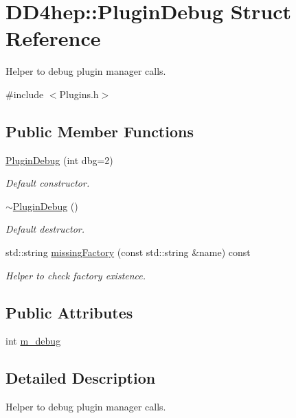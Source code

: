 \hypertarget{struct_d_d4hep_1_1_plugin_debug}{}\section{D\+D4hep\+:\+:Plugin\+Debug Struct Reference}
\label{struct_d_d4hep_1_1_plugin_debug}


Helper to debug plugin manager calls.  




{\ttfamily \#include $<$Plugins.\+h$>$}

\subsection*{Public Member Functions}
\begin{DoxyCompactItemize}
\item 
\hyperlink{struct_d_d4hep_1_1_plugin_debug_a26deb60f08bc415d15c180a7fb5167b5}{Plugin\+Debug} (int dbg=2)
\begin{DoxyCompactList}\small\item\em Default constructor. \end{DoxyCompactList}\item 
\hyperlink{struct_d_d4hep_1_1_plugin_debug_a5c64d5a172b4d20b94d7a367e09a58f1}{$\sim$\+Plugin\+Debug} ()
\begin{DoxyCompactList}\small\item\em Default destructor. \end{DoxyCompactList}\item 
std\+::string \hyperlink{struct_d_d4hep_1_1_plugin_debug_a443212c4151ab1c97fde34a92440bbde}{missing\+Factory} (const std\+::string \&name) const
\begin{DoxyCompactList}\small\item\em Helper to check factory existence. \end{DoxyCompactList}\end{DoxyCompactItemize}
\subsection*{Public Attributes}
\begin{DoxyCompactItemize}
\item 
int \hyperlink{struct_d_d4hep_1_1_plugin_debug_afb83475b5c5eb7cb5410b94972627a20}{m\+\_\+debug}
\end{DoxyCompactItemize}


\subsection{Detailed Description}
Helper to debug plugin manager calls. 

